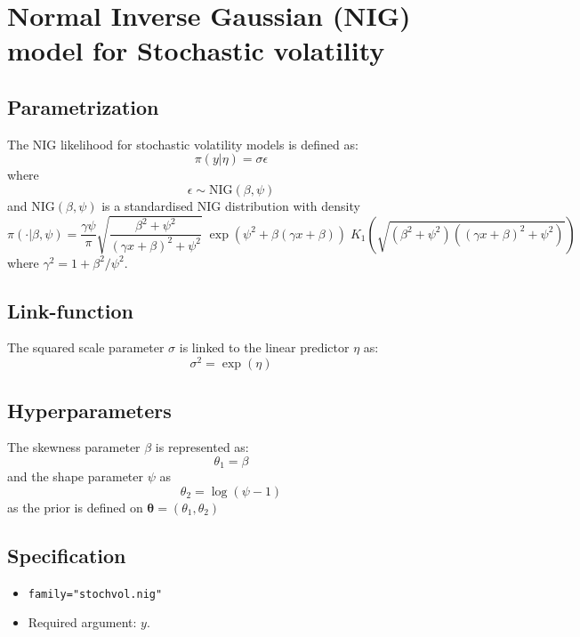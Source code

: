 \documentclass[a4paper,11pt]{article}
\begin{document}
\section*{ Normal Inverse Gaussian (NIG) model for Stochastic
    volatility}

\subsection*{Parametrization}

The NIG likelihood for stochastic volatility models is defined as:
\[
\pi(y |\eta )=\sigma \epsilon
\]
where
\[
\epsilon \sim\mbox{NIG}(\beta,\psi)
\]
and $\mbox{NIG}(\beta,\psi)$ is a standardised NIG distribution with
density
\begin{displaymath}
    \pi(\cdot|\beta,\psi)=\frac{\gamma\psi}{\pi} \sqrt{ \frac{\beta^{2} +
            \psi^{2}}{(\gamma x + \beta)^{2} + \psi^{2}}}
    \;
    \exp\left(\psi^{2} + \beta(\gamma x + \beta)\right)
    \;
    K_{1}\left(\sqrt{ \left(\beta^{2}+\psi^{2}\right)\left((\gamma x
            + \beta)^{2}+\psi^{2}\right)}\right)
\end{displaymath}
where $\gamma^{2} = 1 + \beta^{2}/\psi^{2}$.


\subsection*{Link-function}

The squared scale parameter $\sigma$ is linked to the linear predictor $\eta
$ as:
\[
\sigma^{2} =\exp(\eta)
\]


\subsection*{Hyperparameters}

The skewness parameter $\beta$ is represented as:
\[
\theta_1 = \beta
\]
and the shape parameter $\psi$ as
\[
\theta_2 = \log(\psi-1)
\]
as the prior is defined on $\mathbf{\theta}=(\theta_1,\theta_2)$

\subsection*{Specification}

\begin{itemize}
\item \texttt{family="stochvol.nig"}
\item Required argument: $y$.
\end{itemize}
\end{document}
